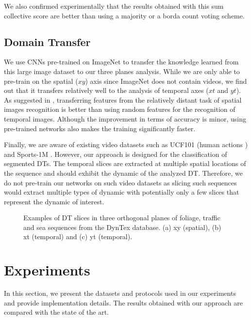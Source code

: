 \documentclass[a4paper,11pt]{article}
\begin{document}
We also confirmed experimentally that the results obtained with this sum collective score are better than using a majority or a borda count voting scheme.



\subsection{Domain Transfer}%
We use CNNs pre-trained on ImageNet to transfer the knowledge learned from this large image dataset to our three planes analysis.
While we are only able to pre-train on the spatial ($xy$) axis since ImageNet does not contain videos, we find out that it transfers relatively well to the analysis of temporal axes ($xt$ and $yt$).
As suggested in \cite{yosinski2014transferable}, transferring features from the relatively distant task of spatial images recognition is better than using random features for the recognition of temporal images.
Although the improvement in terms of accuracy is minor, using pre-trained networks also makes the training significantly faster.

Finally, we are aware of existing video datasets such as UCF101 (human actions \cite{soomro2012ucf101}) and Sports-1M \cite{karpathy2014large}.
However, our approach is designed for the classification of segmented DTs. The temporal slices are extracted at multiple spatial locations of the sequence and should exhibit the dynamic of the analyzed DT.
Therefore, we do not pre-train our networks on such video datasets as slicing such sequences would extract multiple types of dynamic with potentially only a few slices that represent the dynamic of interest.
\begin{figure}[!t]
\centerline{
\hfil
{}
\hfil
{}}
\caption{Examples of DT slices in three orthogonal planes of foliage, traffic and sea sequences from the DynTex database. (a) xy (spatial), (b) xt (temporal) and (c) yt (temporal).}
\label{fig:fig_slices}
\end{figure}

\section{Experiments}
\label{sec:Exp}
In this section, we present the datasets and protocols used in our experiments and provide implementation details.
The results obtained with our approach are compared with the state of the art.
\end{document}
